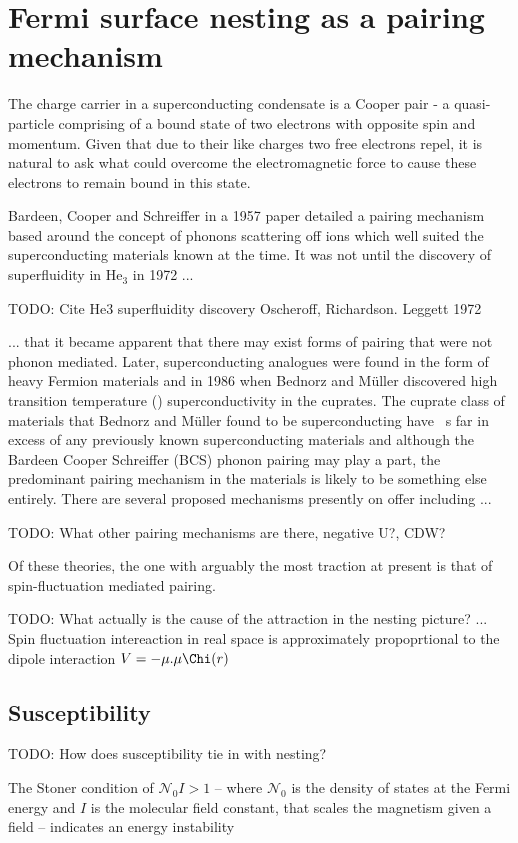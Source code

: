 
\section{Fermi surface nesting as a pairing mechanism}

The charge carrier in a superconducting condensate is a Cooper pair - a quasi-particle comprising of a bound state of two electrons with opposite spin and momentum. Given that due to their like charges two free electrons repel, it is natural to ask what could overcome the electromagnetic force to cause these electrons to remain bound in this state.

Bardeen, Cooper and Schreiffer in a 1957 paper\cite{Bardeen1957} detailed a pairing mechanism based around the concept of phonons scattering off ions which well suited the superconducting materials known at the time. It was not until the discovery of superfluidity in He$_3$ in 1972 ...

TODO: Cite He3 superfluidity discovery Oscheroff, Richardson. Leggett 1972

... that it became apparent that there may exist forms of pairing that were not phonon mediated. Later, superconducting analogues were found in the form of heavy Fermion materials and in 1986 when Bednorz and M\"uller\cite{Bednorz} discovered high transition temperature (\Tc) superconductivity in the cuprates. The cuprate class of materials that Bednorz and M\"uller found to be superconducting have \Tc~s far in excess of any previously known superconducting materials and although the Bardeen Cooper Schreiffer (BCS) phonon pairing may play a part, the predominant pairing mechanism in the \highTc materials is likely to be something else entirely\cite{Mazin2008}. There are several proposed mechanisms presently on offer including ...

TODO: What other pairing mechanisms are there, negative U?, CDW?

Of these theories, the one with arguably the most traction at present is that of spin-fluctuation mediated pairing. 

TODO: What actually is the cause of the attraction in the nesting picture? ... Spin fluctuation intereaction in real space is approximately propoprtional to the dipole interaction $V=-\mu . \mu \Chi(r)$\cite{Bergemann2003} 

\subsection{Susceptibility}
    \label{Sec:1:NestingSusceptibility}

TODO: How does susceptibility tie in with nesting?




The Stoner condition of $\mathcal{N}_0 I > 1$ -- where $\mathcal{N}_0$ is the density of states at the Fermi energy and $I$ is the molecular field constant, that scales the magnetism given a field -- indicates an energy instability\cite{Kubler2000}
